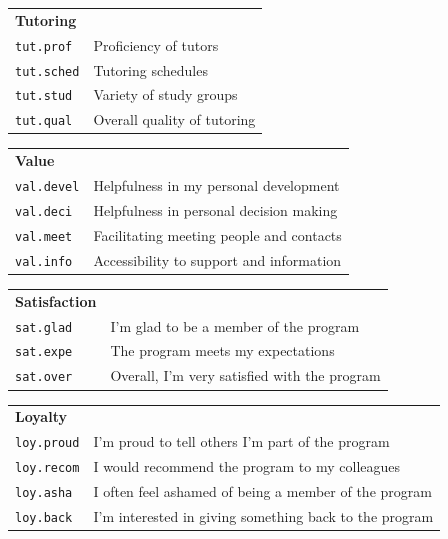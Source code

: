\documentclass[12pt]{book}\usepackage{graphicx, color}
\newcommand{\code}[1]{\texttt{#1}}
\begin{document}
\begin{tabular}{l l}
 \textbf{Tutoring} & \\
 \code{tut.prof} & Proficiency of tutors \\
 \code{tut.sched} & Tutoring schedules \\
 \code{tut.stud} & Variety of study groups \\
 \code{tut.qual} & Overall quality of tutoring \\
\end{tabular}

\begin{tabular}{l l}
 \textbf{Value} & \\
 \code{val.devel} & Helpfulness in my personal development \\
 \code{val.deci} & Helpfulness in personal decision making \\
 \code{val.meet} & Facilitating meeting people and contacts \\
 \code{val.info} & Accessibility to support and information \\
\end{tabular}

\begin{tabular}{l l}
 \textbf{Satisfaction} & \\
 \code{sat.glad} & I'm glad to be a member of the program \\
 \code{sat.expe} & The program meets my expectations \\
 \code{sat.over} & Overall, I'm very satisfied with the program \\
\end{tabular}

\begin{tabular}{l l}
 \textbf{Loyalty} & \\
 \code{loy.proud} & I'm proud to tell others I'm part of the program \\
 \code{loy.recom} & I would recommend the program to my colleagues \\
 \code{loy.asha} & I often feel ashamed of being a member of the program \\
 \code{loy.back} & I'm interested in giving something back to the program \\
\end{tabular}
\end{document}
